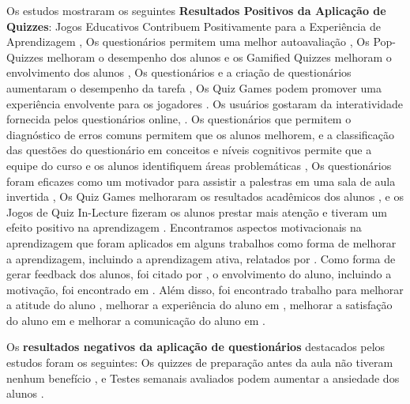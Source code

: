 Os estudos mostraram os seguintes \textbf{Resultados Positivos da Aplicação de Quizzes}: Jogos Educativos Contribuem Positivamente para a Experiência de Aprendizagem \cite{petri_quality_2017}, 
Os questionários permitem uma melhor autoavaliação \cite{figueiredo_evaluation_2014},
Os Pop-Quizzes melhoram o desempenho dos alunos e os Gamified Quizzes melhoram o envolvimento dos alunos \cite{luxton-reilly_introductory_2018},
Os questionários e a criação de questionários aumentaram o desempenho da tarefa \cite{ogawa_evaluation_2018},
Os Quiz Games podem promover uma experiência envolvente para os jogadores \cite{petri_games_2018}.
Os usuários gostaram da interatividade fornecida pelos questionários online, \cite{krugel_computational_2017}.
Os questionários que permitem o diagnóstico de erros comuns permitem que os alunos melhorem, e a classificação das questões do questionário em conceitos e níveis cognitivos permite que a equipe do curso e os alunos identifiquem áreas problemáticas \cite{thevathayan_imparting_2017},
Os questionários foram eficazes como um motivador para assistir a palestras em uma sala de aula invertida \cite{herold_student_2012},
Os Quiz Games melhoraram os resultados acadêmicos dos alunos \cite{verdu_distributed_2012}, e os Jogos de Quiz In-Lecture fizeram os alunos prestar mais atenção e tiveram um efeito positivo na aprendizagem \cite{wu_improvement_2011}.
Encontramos aspectos motivacionais na aprendizagem que foram aplicados em alguns trabalhos como forma de melhorar a aprendizagem, incluindo a aprendizagem ativa, relatados por \cite{figueiredo_evaluation_2014, petri_quality_2017, acharya_infusing_2017, herold_student_2012, petri_games_2018}. Como forma de gerar feedback dos alunos, foi citado por \cite{figueiredo_evaluation_2014, krugel_computational_2017, verdu_distributed_2012}, o envolvimento do aluno, incluindo a motivação, foi encontrado em \cite{coore_facilitating_2019, luxton-reilly_introductory_2018,verdu_distributed_2012}. Além disso, foi encontrado trabalho para melhorar a atitude do aluno \cite{luxton-reilly_introductory_2018}, melhorar a experiência do aluno em \cite{luxton-reilly_introductory_2018, petri_games_2018}, melhorar a satisfação do aluno em \cite{verdu_distributed_2012} e melhorar a comunicação do aluno em \cite{wu_improvement_2011}.

Os \textbf{resultados negativos da aplicação de questionários} destacados pelos estudos foram os seguintes: Os quizzes de preparação antes da aula não tiveram nenhum benefício \cite{luxton-reilly_introductory_2018}, e
Testes semanais avaliados podem aumentar a ansiedade dos alunos \cite{herold_student_2012}.

